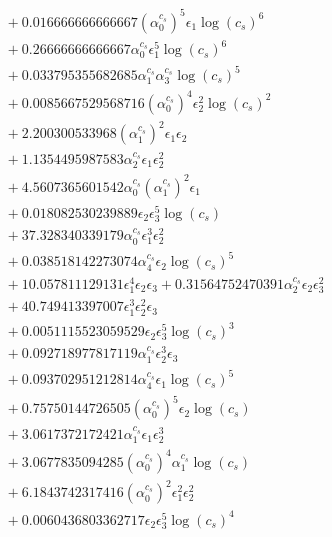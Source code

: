 \documentclass[10pt]{article}
\begin{document}
\begin{align*}
&{}  + 0.016666666666667 \left(\alpha_{0}^{c_s}\right)^{5} \epsilon_{1} \log{\left(c_{s} \right)}^{6} \\
&{}  + 0.26666666666667 \alpha_{0}^{c_s} \epsilon_{1}^{5} \log{\left(c_{s} \right)}^{6} \\
&{}  + 0.033795355682685 \alpha_{1}^{c_s} \alpha_{3}^{c_s} \log{\left(c_{s} \right)}^{5} \\
&{}  + 0.0085667529568716 \left(\alpha_{0}^{c_s}\right)^{4} \epsilon_{2}^{2} \log{\left(c_{s} \right)}^{2} \\
&{}  + 2.200300533968 \left(\alpha_{1}^{c_s}\right)^{2} \epsilon_{1} \epsilon_{2} \\
&{}  + 1.1354495987583 \alpha_{2}^{c_s} \epsilon_{1} \epsilon_{2}^{2} \\
&{}  + 4.5607365601542 \alpha_{0}^{c_s} \left(\alpha_{1}^{c_s}\right)^{2} \epsilon_{1} \\
&{}  + 0.018082530239889 \epsilon_{2} \epsilon_{3}^{5} \log{\left(c_{s} \right)} \\
&{}  + 37.328340339179 \alpha_{0}^{c_s} \epsilon_{1}^{3} \epsilon_{2}^{2} \\
&{}  + 0.038518142273074 \alpha_{4}^{c_s} \epsilon_{2} \log{\left(c_{s} \right)}^{5} \\
&{}  + 10.057811129131 \epsilon_{1}^{4} \epsilon_{2} \epsilon_{3} + 0.31564752470391 \alpha_{2}^{c_s} \epsilon_{2} \epsilon_{3}^{2} \\
&{}  + 40.749413397007 \epsilon_{1}^{3} \epsilon_{2}^{2} \epsilon_{3} \\
&{}  + 0.0051115523059529 \epsilon_{2} \epsilon_{3}^{5} \log{\left(c_{s} \right)}^{3} \\
&{}  + 0.092718977817119 \alpha_{1}^{c_s} \epsilon_{2}^{3} \epsilon_{3} \\
&{}  + 0.093702951212814 \alpha_{4}^{c_s} \epsilon_{1} \log{\left(c_{s} \right)}^{5} \\
&{}  + 0.75750144726505 \left(\alpha_{0}^{c_s}\right)^{5} \epsilon_{2} \log{\left(c_{s} \right)} \\
&{}  + 3.0617372172421 \alpha_{1}^{c_s} \epsilon_{1} \epsilon_{2}^{3} \\
&{}  + 3.0677835094285 \left(\alpha_{0}^{c_s}\right)^{4} \alpha_{1}^{c_s} \log{\left(c_{s} \right)} \\
&{}  + 6.1843742317416 \left(\alpha_{0}^{c_s}\right)^{2} \epsilon_{1}^{2} \epsilon_{2}^{2} \\
&{}  + 0.0060436803362717 \epsilon_{2} \epsilon_{3}^{5} \log{\left(c_{s} \right)}^{4} \\

\end{align*}
\end{document}
